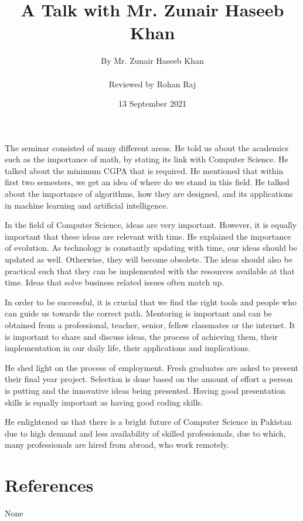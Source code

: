 \documentclass{article}
\title{A Talk with Mr. Zunair Haseeb Khan} %
\author{By Mr. Zunair Haseeb Khan \\ \\ Reviewed by Rohan Raj} %
\date{13 September 2021} %
\begin{document}
\maketitle
The seminar consisted of many different areas. He told us about the academics such as the importance of math, by stating its link with Computer Science. He talked about the minimum CGPA that is required. He mentioned that within first two semesters, we get an idea of where do we stand in this field. He talked about the importance of algorithms, how they are designed, and its applications in machine learning and artificial intelligence.
\par
In the field of Computer Science, ideas are very important. However, it is equally important that these ideas are relevant with time. He explained the importance of evolution. As technology is constantly updating with time, our ideas should be updated as well. Otherwise, they will become obsolete. The ideas should also be practical such that they can be implemented with the resources available at that time. Ideas that solve business related issues often match up.
\par
In order to be successful, it is crucial that we find the right tools and people who can guide us towards the correct path. Mentoring is important and can be obtained from a professional, teacher, senior, fellow classmates or the internet. It is important to share and discuss ideas, the process of achieving them, their implementation in our daily life, their applications and implications.
\par
He shed light on the process of employment. Fresh graduates are asked to present their final year project. Selection is done based on the amount of effort a person is putting and the innovative ideas being presented. Having good presentation skills is equally important as having good coding skills.
\par
He enlightened us that there is a bright future of Computer Science in Pakistan due to high demand and less availability of skilled professionals, due to which, many professionals are hired from abroad, who work remotely.
\section*{References}
None 
\end{document}
